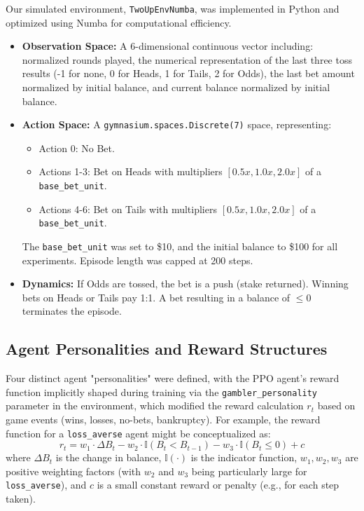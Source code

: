\documentclass{article}
\begin{document}
Our simulated environment, \texttt{TwoUpEnvNumba}, was implemented in Python and optimized using Numba for computational efficiency.
\begin{itemize}
    \item \textbf{Observation Space:} A 6-dimensional continuous vector including: normalized rounds played, the numerical representation of the last three toss results (-1 for none, 0 for Heads, 1 for Tails, 2 for Odds), the last bet amount normalized by initial balance, and current balance normalized by initial balance.
    \item \textbf{Action Space:} A \texttt{gymnasium.spaces.Discrete(7)} space, representing:
    \begin{itemize}
        \item Action 0: No Bet.
        \item Actions 1-3: Bet on Heads with multipliers \([0.5x, 1.0x, 2.0x]\) of a \texttt{base\_bet\_unit}.
        \item Actions 4-6: Bet on Tails with multipliers \([0.5x, 1.0x, 2.0x]\) of a \texttt{base\_bet\_unit}.
    \end{itemize}
    The \texttt{base\_bet\_unit} was set to \$10, and the initial balance to \$100 for all experiments. Episode length was capped at 200 steps.
    \item \textbf{Dynamics:} If Odds are tossed, the bet is a push (stake returned). Winning bets on Heads or Tails pay 1:1. A bet resulting in a balance of \(\le 0\) terminates the episode.
\end{itemize}

\subsection{Agent Personalities and Reward Structures}
Four distinct agent "personalities" were defined, with the PPO agent's reward function implicitly shaped during training via the \texttt{gambler\_personality} parameter in the environment, which modified the reward calculation \(r_t\) based on game events (wins, losses, no-bets, bankruptcy). For example, the reward function for a \texttt{loss\_averse} agent might be conceptualized as:
\[ r_t = w_1 \cdot \Delta B_t - w_2 \cdot \mathbb{I}(B_t < B_{t-1}) - w_3 \cdot \mathbb{I}(B_t \le 0) + c \]
where \(\Delta B_t\) is the change in balance, \(\mathbb{I}(\cdot)\) is the indicator function, \(w_1, w_2, w_3\) are positive weighting factors (with \(w_2\) and \(w_3\) being particularly large for \texttt{loss\_averse}), and \(c\) is a small constant reward or penalty (e.g., for each step taken).
\end{document}
